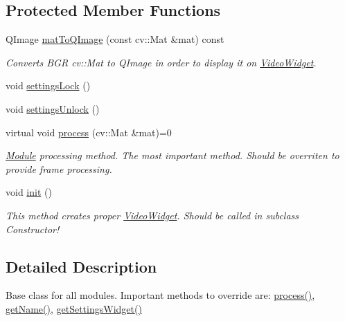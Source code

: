 \subsection*{Protected Member Functions}
\begin{DoxyCompactItemize}
\item 
QImage \hyperlink{class_module_a74dffbc8228fd6e3722e3f93a33f3eb1}{matToQImage} (const cv::Mat \&mat) const 
\begin{DoxyCompactList}\small\item\em Converts BGR cv::Mat to QImage in order to display it on \hyperlink{class_video_widget}{VideoWidget}. \item\end{DoxyCompactList}\item 
void \hyperlink{class_module_a56495f4dcfb3fc0a77178ba47a5414c9}{settingsLock} ()
\item 
void \hyperlink{class_module_a1834931d5ddcdc84d9289661aaf0cece}{settingsUnlock} ()
\item 
virtual void \hyperlink{class_module_a5105981c562627043d38527dc31124c8}{process} (cv::Mat \&mat)=0
\begin{DoxyCompactList}\small\item\em \hyperlink{class_module}{Module} processing method. The most important method. Should be overriten to provide frame processing. \item\end{DoxyCompactList}\item 
\hypertarget{class_module_ad1956ac81429ec1f61f83dbc081cf18c}{
void \hyperlink{class_module_ad1956ac81429ec1f61f83dbc081cf18c}{init} ()}
\label{dd/df9/class_module_ad1956ac81429ec1f61f83dbc081cf18c}

\begin{DoxyCompactList}\small\item\em This method creates proper \hyperlink{class_video_widget}{VideoWidget}. Should be called in subclass Constructor! \item\end{DoxyCompactList}\end{DoxyCompactItemize}


\subsection{Detailed Description}
Base class for all modules. Important methods to override are: \hyperlink{class_module_a5105981c562627043d38527dc31124c8}{process()}, \hyperlink{class_module_a1cf07480fdd9a964eb8375bf2fb549b0}{getName()}, \hyperlink{class_module_a7a6a83882ef0d9aec623577884ce2fb5}{getSettingsWidget()}

